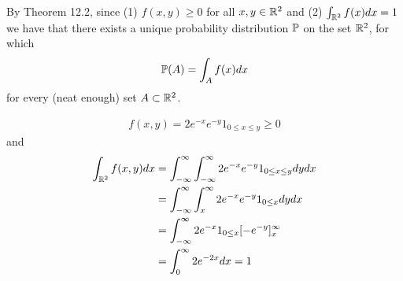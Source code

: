 
By Theorem 12.2, since (1) $ f(x,y) \geq 0$ for all $ x,y \in \R^{2} $ and (2) $ \int_{\R^{2} } f(x)
dx = 1$ we have that there exists a unique probability distribution $ \P$ on the set $ \R^{2} $, for
which 
\[
     \P(A) = \int_{A} f(x) dx
\]
for every (neat enough) set $ A \subset \R^{2} $.

\begin{align*}
    f(x,y) = 2 e^{-x} e^{-y} 1_{0 \leq x \leq y} \geq 0
\end{align*}
and 
\begin{align*}
    \int_{\R^{2} } f(x,y) dx &= \int_{-\infty}^{\infty} \int_{-\infty}^{\infty} 2 e^{-x} e^{-y} 1_{0
    \leq x \leq y} dy dx\\
			     &= \int_{-\infty}^{\infty} \int_{x}^{\infty} 2 e^{-x} e^{-y} 1_{0 \leq
			     x} dy dx \\
			     &= \int_{-\infty}^{\infty} 2 e^{-x} 1_{0 \leq x} [-e^{-y}
			     ]_{x}^{\infty} \\
			     &= \int_{0}^{\infty} 2 e^{-2x} dx = 1
\end{align*}

